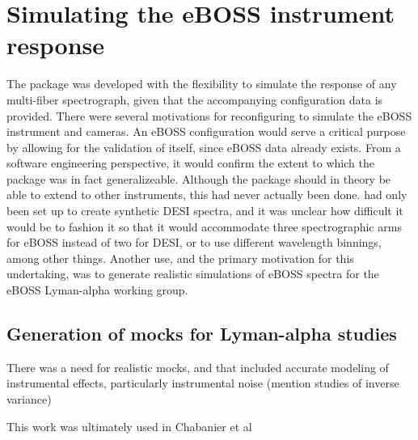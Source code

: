 \section{Simulating the eBOSS instrument response}


The  package was developed with the flexibility to simulate the response of any multi-fiber spectrograph, given that the accompanying configuration data is provided. There were several motivations for reconfiguring  to simulate the eBOSS instrument and cameras. An eBOSS configuration would serve a critical purpose by allowing for the validation of  itself, since eBOSS data already exists. From a software engineering perspective, it would confirm the extent to which the package was in fact generalizeable. Although the package should in theory be able to extend to other instruments, this had never actually been done.  had only been set up to create synthetic DESI spectra, and it was unclear how difficult it would be to fashion it so that it would accommodate three spectrographic arms for eBOSS instead of two for DESI, or to use different wavelength binnings, among other things. Another use, and the primary motivation for this undertaking, was to generate realistic simulations of eBOSS spectra for the eBOSS Lyman-alpha working group.

\subsection{Generation of mocks for Lyman-alpha studies}

There was a need for realistic mocks, and that included accurate modeling of instrumental effects, particularly instrumental noise (mention studies of inverse variance)




This work was ultimately used in Chabanier et al


